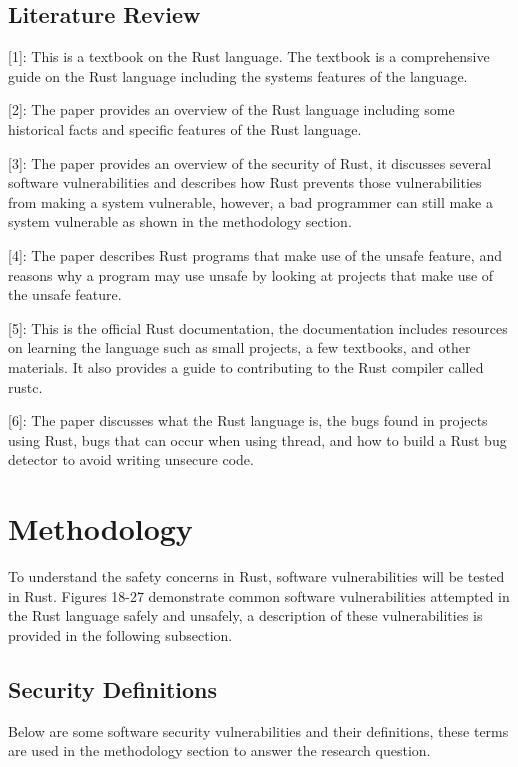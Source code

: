 \documentclass[sigconf,authorversion,nonacm]{acmart}
\begin{document}
\subsection*{Literature Review}

[1]: This is a textbook on the Rust language. The textbook is a comprehensive guide on the Rust language including the systems features of the language. 

[2]: The paper provides an overview of the Rust language including some historical facts and specific features of the Rust language.

[3]: The paper provides an overview of the security of Rust, it discusses several software vulnerabilities and describes how Rust prevents those vulnerabilities from making a system vulnerable, however, a bad programmer can still make a system vulnerable as shown in the methodology section.  

[4]: The paper describes Rust programs that make use of the unsafe feature, and reasons why a program may use unsafe by looking at projects that make use of the unsafe feature. 

[5]: This is the official Rust documentation, the documentation includes resources on learning the language such as small projects, a few textbooks, and other materials. It also provides a guide to contributing to the Rust compiler called rustc. 

[6]: The paper discusses what the Rust language is, the bugs found in projects using Rust, bugs that can occur when using thread, and how to build a Rust bug detector to avoid writing unsecure code.

\section*{Methodology}
To understand the safety concerns in Rust, software vulnerabilities will be tested in Rust. Figures 18-27 demonstrate common software vulnerabilities attempted in the Rust language safely and unsafely, a description of these vulnerabilities is provided in the following subsection.

\subsection*{Security Definitions}
Below are some software security vulnerabilities and their definitions, these terms are used in the methodology section to answer the research question.
\end{document}
